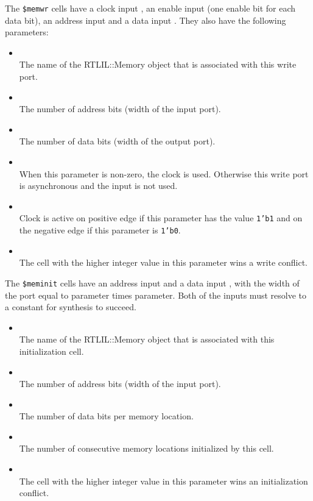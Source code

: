 The {\tt \$memwr} cells have a clock input , an enable input  (one
enable bit for each data bit), an address input  and a data input
. They also have the following parameters:

\begin{itemize}
\item {} \\
The name of the RTLIL::Memory object that is associated with this write port.

\item {} \\
The number of address bits (width of the  input port).

\item {} \\
The number of data bits (width of the  output port).

\item {} \\
When this parameter is non-zero, the clock is used. Otherwise this write port is asynchronous and
the  input is not used.

\item {} \\
Clock is active on positive edge if this parameter has the value {\tt 1'b1} and on the negative
edge if this parameter is {\tt 1'b0}.

\item {} \\
The cell with the higher integer value in this parameter wins a write conflict.
\end{itemize}

The {\tt \$meminit} cells have an address input  and a data input , with the width
of the  port equal to  parameter times  parameter. Both of the inputs
must resolve to a constant for synthesis to succeed.

\begin{itemize}
\item {} \\
The name of the RTLIL::Memory object that is associated with this initialization cell.

\item {} \\
The number of address bits (width of the  input port).

\item {} \\
The number of data bits per memory location.

\item {} \\
The number of consecutive memory locations initialized by this cell.

\item {} \\
The cell with the higher integer value in this parameter wins an initialization conflict.
\end{itemize}

